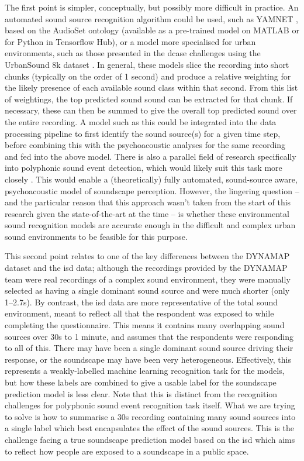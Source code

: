 The first point is simpler, conceptually, but possibly more difficult in practice. An automated sound source recognition algorithm could be used, such as YAMNET \citep{Hershey2017CNN}, based on the AudioSet ontology \citep{Gemmeke2017Audio} (available as a pre-trained model on MATLAB or for Python in Tensorflow Hub), or a model more specialised for urban environments, such as those presented in the \gls{dcase} challenges \citep{Bello2019SONYC} using the UrbanSound 8k dataset \citep{Salamon2014Dataset}. In general, these models slice the recording into short chunks (typically on the order of 1 second) and produce a relative weighting for the likely presence of each available sound class within that second. From this list of weightings, the top predicted sound sound can be extracted for that chunk. If necessary, these can then be summed to give the overall top predicted sound over the entire recording. A model such as this could be integrated into the data processing pipeline to first identify the sound source(s) for a given time step, before combining this with the psychoacoustic analyses for the same recording and fed into the above model. There is also a parallel field of research specifically into polyphonic sound event detection, which would likely suit this task more closely \citep{Mesaros2016Metrics}. This would enable a (theoretically) fully automated, sound-source aware, psychoacoustic model of soundscape perception. However, the lingering question -- and the particular reason that this approach wasn't taken from the start of this research given the state-of-the-art at the time -- is whether these environmental sound recognition models are accurate enough in the difficult and complex urban sound environments to be feasible for this purpose. 

This second point relates to one of the key differences between the DYNAMAP dataset and the \gls{isd} data; although the recordings provided by the DYNAMAP team were real recordings of a complex sound environment, they were manually selected as having a single dominant sound source and were much shorter (only 1--2.7s). By contrast, the \gls{isd} data are more representative of the total sound environment, meant to reflect all that the respondent was exposed to while completing the questionnaire. This means it contains many overlapping sound sources over 30s to 1 minute, and assumes that the respondents were responding to all of this. There may have been a single dominant sound source driving their response, or the soundscape may have been very heterogeneous. Effectively, this represents a weakly-labelled machine learning recognition task for the models, but how these labels are combined to give a usable label for the soundscape prediction model is less clear. Note that this is distinct from the recognition challenges for polyphonic sound event recognition task itself. What we are trying to solve is how to summarise a 30s recording containing many sound sources into a single label which best encapsulates the effect of the sound sources. This is the challenge facing a true soundscape prediction model based on the \gls{isd} which aims to reflect how people are exposed to a soundscape in a public space. 

